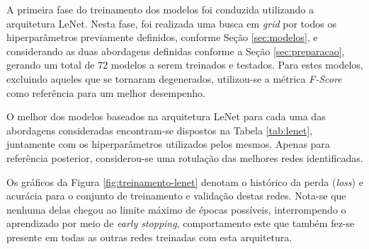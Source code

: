 

A primeira fase do treinamento dos modelos foi conduzida utilizando a arquitetura LeNet. Nesta fase, foi realizada uma busca em \emph{grid} por todos os hiperparâmetros previamente definidos, conforme Seção \ref{sec:modelos}, e considerando as duas abordagens definidas conforme a Seção \ref{sec:preparacao}, gerando um total de $72$ modelos a serem treinados e testados. Para estes modelos, excluindo aqueles que se tornaram degenerados, utilizou-se a métrica \emph{F-Score} como referência para um melhor desempenho.

O melhor dos modelos baseados na arquitetura LeNet para cada uma das abordagens consideradas encontram-se dispostos na Tabela \ref{tab:lenet}, juntamente com os hiperparâmetros utilizados pelos mesmos. Apenas para referência posterior, considerou-se uma rotulação das melhores redes identificadas.

\begin{table}[h]
\centering
\caption{Detalhamento dos melhores resultados obtidos com a arquitetura LeNet.}
\label{tab:lenet}
\end{table}


Os gráficos da Figura \ref{fig:treinamento-lenet} denotam o histórico da perda (\emph{loss}) e acurácia para o conjunto de treinamento e validação destas redes. Nota-se que nenhuma delas chegou ao limite máximo de épocas possíveis, interrompendo o aprendizado por meio de \emph{early stopping}, comportamento este que também fez-se presente em todas as outras redes treinadas com esta arquitetura.

